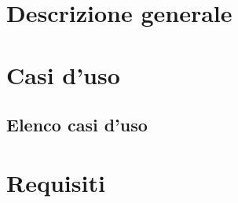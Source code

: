\documentclass[a4paper, oneside, dvipsnames, table]{article}
\begin{document}
\copertina{}
\newpage



\fancydoc{}

\clearpage
\tableofcontents
\clearpage
\listoffigures
\clearpage



\section{Descrizione generale}


\section{Casi d'uso}

\clearpage
\subsection{Elenco casi d'uso}
\setcounter{secnumdepth}{0}

\clearpage

\section{Requisiti}




\end{document}
